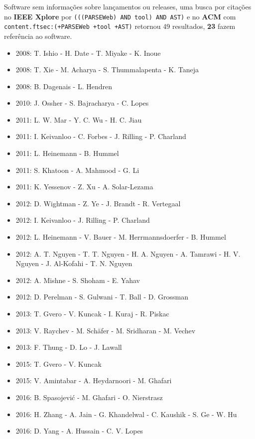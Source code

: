 Software sem informações sobre lançamentos ou releases,
uma busca por citações no {\bf IEEE Xplore} por
\texttt{(((PARSEWeb) AND tool) AND AST)}
e no {\bf ACM} com
\texttt{content.ftsec:(+PARSEWeb +tool +AST)}
retornou
49 resultados,
{\bf 23} fazem referência ao software.

\begin{itemize}
\item 2008: T. Ishio - H. Date - T. Miyake - K. Inoue
\item 2008: T. Xie - M. Acharya - S. Thummalapenta - K. Taneja
\item 2008: B. Dagenais - L. Hendren
\item 2010: J. Ossher - S. Bajracharya - C. Lopes
\item 2011: L. W. Mar - Y. C. Wu - H. C. Jiau
\item 2011: I. Keivanloo - C. Forbes - J. Rilling - P. Charland
\item 2011: L. Heinemann - B. Hummel
\item 2011: S. Khatoon - A. Mahmood - G. Li
\item 2011: K. Yessenov - Z. Xu - A. Solar-Lezama
\item 2012: D. Wightman - Z. Ye - J. Brandt - R. Vertegaal
\item 2012: I. Keivanloo - J. Rilling - P. Charland
\item 2012: L. Heinemann - V. Bauer - M. Herrmannsdoerfer - B. Hummel
\item 2012: A. T. Nguyen - T. T. Nguyen - H. A. Nguyen - A. Tamrawi - H. V. Nguyen - J. Al-Kofahi - T. N. Nguyen
\item 2012: A. Mishne - S. Shoham - E. Yahav
\item 2012: D. Perelman - S. Gulwani - T. Ball - D. Grossman
\item 2013: T. Gvero - V. Kuncak - I. Kuraj - R. Piskac
\item 2013: V. Raychev - M. Sch\"{a}fer - M. Sridharan - M. Vechev
\item 2013: F. Thung - D. Lo - J. Lawall
\item 2015: T. Gvero - V. Kuncak
\item 2015: V. Amintabar - A. Heydarnoori - M. Ghafari
\item 2016: B. Spasojevi\'{c} - M. Ghafari - O. Nierstrasz
\item 2016: H. Zhang - A. Jain - G. Khandelwal - C. Kaushik - S. Ge - W. Hu
\item 2016: D. Yang - A. Hussain - C. V. Lopes
\end{itemize}

